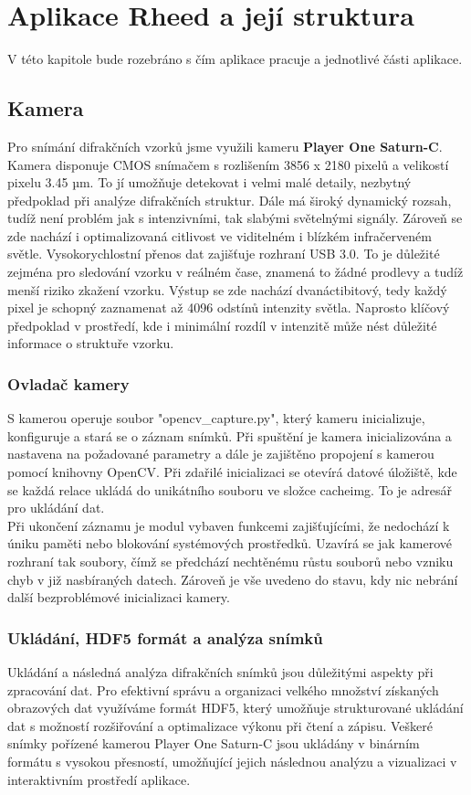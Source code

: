 \documentclass{article}
\begin{document}
\section{Aplikace Rheed a její struktura}
    V této kapitole bude rozebráno s čím aplikace pracuje a jednotlivé části aplikace.
\subsection{Kamera}
Pro snímání difrakčních vzorků jsme využili kameru \textbf{Player One Saturn-C}. Kamera disponuje CMOS snímačem s rozlišením 3856 x 2180 pixelů a velikostí pixelu 3.45 µm. To jí umožňuje detekovat i velmi malé detaily, nezbytný předpoklad při analýze difrakčních struktur.
    Dále má široký dynamický rozsah, tudíž není problém jak s intenzivními, tak slabými světelnými signály. Zároveň se zde nachází i optimalizovaná citlivost ve viditelném i blízkém infračerveném světle.
    Vysokorychlostní přenos dat zajišťuje rozhraní USB 3.0. To je důležité zejména pro sledování vzorku v reálném čase, znamená to žádné prodlevy a tudíž menší riziko zkažení vzorku.
    Výstup se zde nachází dvanáctibitový, tedy každý pixel je schopný zaznamenat až 4096 odstínů intenzity světla. Naprosto klíčový předpoklad v prostředí, kde i minimální rozdíl v intenzitě může nést důležité informace o struktuře vzorku.

\subsubsection{Ovladač kamery}
S kamerou operuje soubor "opencv\_capture.py", který kameru inicializuje, konfiguruje a stará se o záznam snímků. Při spuštění je kamera inicializována a nastavena na požadované parametry a dále je zajištěno propojení s kamerou pomocí knihovny OpenCV. Při zdařilé inicializaci se otevírá datové úložiště, kde se každá relace ukládá do unikátního souboru ve složce cacheimg. To je adresář pro ukládání dat.\\

Při ukončení záznamu je modul vybaven funkcemi zajišťujícími, že nedochází k úniku paměti nebo blokování systémových prostředků. Uzavírá se jak kamerové rozhraní tak soubory, čímž se předchází nechtěnému růstu souborů nebo vzniku chyb v již nasbíraných datech. Zároveň je vše uvedeno do stavu, kdy nic nebrání další bezproblémové inicializaci kamery.


\subsubsection{Ukládání, HDF5 formát a analýza snímků}
Ukládání a následná analýza difrakčních snímků jsou důležitými aspekty při zpracování dat. Pro efektivní správu a organizaci velkého množství získaných obrazových dat využíváme formát HDF5, který umožňuje strukturované ukládání dat s možností rozšiřování a optimalizace výkonu při čtení a zápisu. Veškeré snímky pořízené kamerou Player One Saturn-C jsou ukládány v binárním formátu s vysokou přesností, umožňující jejich následnou analýzu a vizualizaci v interaktivním prostředí aplikace.\\
\end{document}
